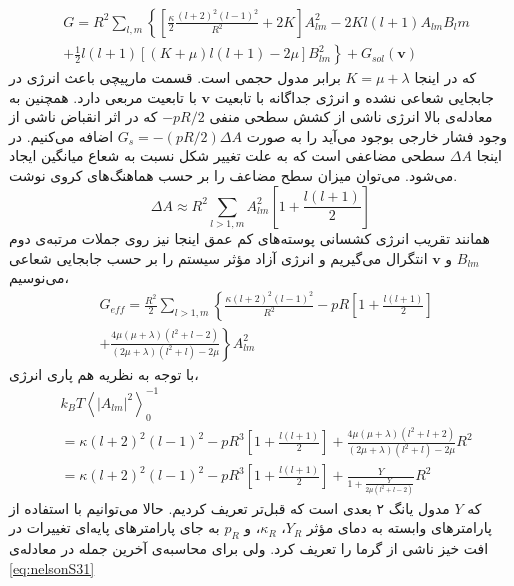\begin{equation}
\begin{aligned}
&G=R^2\sum_{l,m}\left\{\left[\frac{\kappa}{2}\frac{(l+2)^2(l-1)^2}{R^2}+2K\right]A_{lm}^2-2Kl(l+1)A_{lm}B_lm\right.\\
&\left.+\frac{1}{2}l(l+1)[(K+\mu)l(l+1)-2\mu]B_{lm}^2\right\}+G_{sol}(\boldsymbol v)
\label{eq:nelsonS28}
\end{aligned}
\end{equation} 
که در اینجا $K=\mu+\lambda$
برابر مدول حجمی‌ 
است. قسمت مارپیچی باعث انرژی در جابجایی شعاعی نشده و انرژی جداگانه با تابعیت $\boldsymbol v$ با تابعیت مربعی دارد. همچنین به معادله‌ی بالا انرژی ناشی از کشش سطحی منفی $-pR/2$ که در اثر انقباض ناشی از وجود فشار خارجی بوجود می‌آید را به صورت $G_s=-(pR/2)\Delta A$ اضافه می‌کنیم. در اینجا $\Delta A$ سطحی مضاعفی است که به علت تغییر شکل نسبت به شعاع میانگین ایجاد می‌شود. می‌توان میزان سطح مضاعف را بر حسب هماهنگ‌های کروی نوشت.
\cite{milnersafranPRA1987}
\begin{equation}
\Delta A\approx R^2\sum_{l>1,m}A_{lm}^2\left[1+\frac{l(l+1)}{2}\right]
\label{eq:nelsonS29}
\end{equation} 
همانند تقریب انرژی کشسانی پوسته‌های کم عمق اینجا نیز روی جملات مرتبه‌ی دوم $B_{lm}$ و $\boldsymbol v$ انتگرال می‌گیریم و انرژی آزاد مؤثر سیستم را بر حسب جابجایی شعاعی می‌نوسیم،
\begin{equation}
\begin{aligned}
&G_{eff}=\frac{R^2}{2}\sum_{l>1,m}\left\{\frac{\kappa(l+2)^2(l-1)^2}{R^2}-pR\left[1+\frac{l(l+1)}{2}\right]\right.\\
&\left.+\frac{4\mu(\mu+\lambda)(l^2+l-2)}{(2\mu+\lambda)(l^2+l)-2\mu}\right\}A_{lm}^2
\label{eq:nelsonS30}
\end{aligned}
\end{equation} 
 با توجه به نظریه هم پاری انرژی،
\begin{equation}
\begin{aligned}
&k_BT\left\langle|A_{lm}|^2\right\rangle_0^{-1}\\
&=\kappa(l+2)^2(l-1)^2-pR^3\left[1+\frac{l(l+1)}{2}\right]+\frac{4\mu(\mu+\lambda)(l^2+l+2)}{(2\mu+\lambda)(l^2+l)-2\mu}R^2\\
&=\kappa(l+2)^2(l-1)^2-pR^3\left[1+\frac{l(l+1)}{2}\right]+\frac{Y}{1+\frac{Y}{2\mu(l^2+l-2)}}R^2
\label{eq:nelsonS31}
\end{aligned}
\end{equation} 
که $Y$ مدول یانگ ۲ بعدی است که قبل‌تر تعریف کردیم. حالا می‌توانیم با استفاده از پارامتر‌های وابسته به دمای مؤثر $Y_R$، $\kappa_R$، و $p_R$ به جای پارامتر‌های پایه‌ای تغییرات در افت خیز ناشی از گرما را تعریف کرد. ولی برای محاسبه‌ی آخرین جمله در معادله‌ی \ref{eq:nelsonS31} 
